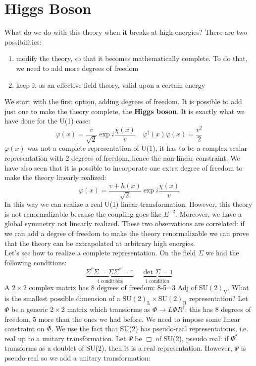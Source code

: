 \documentclass[../main.tex]{subfiles}
\begin{document}
\section{Higgs Boson}
What do we do with this theory when it breaks at high energies? There are two possibilities:
\begin{enumerate}
    \item modify the theory, so that it becomes mathematically complete. To do that, we need to add more degrees of freedom
    \item keep it as an effective field theory, valid upon a certain energy
\end{enumerate}
We start with the first option, adding degrees of freedom. It is possible to add just one to make the theory complete, the \textbf{Higgs boson}. It is exactly what we have done for the U(1) case:
\[
\varphi(x)=\frac{v}{\sqrt{2}}\exp{i\frac{\chi(x)}{v}} \quad \varphi^\dagger(x)\varphi(x)=\frac{v^2}{2}
\]
$\varphi(x)$ was not a complete representation of U(1), it has to be a complex scalar representation with 2 degrees of freedom, hence the non-linear constraint. We have also seen that it is possible to incorporate one extra degree of freedom to make the theory linearly realized:
\[
\varphi(x)=\frac{v+h(x)}{\sqrt{2}}\exp{i\frac{\chi(x)}{v}}
\]
In this way we can realize a real U(1) linear transformation. However, this theory is not renormalizable because the coupling goes like $E^{-2}$. Moreover, we have a global symmetry not linearly realized. These two observations are correlated: if we can add a degree of freedom to make the theory renormalizable we can prove that the theory can be extrapolated at arbitrary high energies. \\
Let's see how to realize a complete representation. On the field $\Sigma$ we had the following conditions:
\[
\underbrace{\Sigma^\dagger\Sigma=\Sigma\Sigma^\dagger=\mathbb{1}}_{\text{4 conditions}} \quad \underbrace{\det\Sigma=1}_{\text{1 condition}}
\]
A $2\times2$ complex matrix has 8 degrees of freedom: 8-5=3 Adj of SU$(2)_{\text{V}}$. What is the smallest possible dimension of a SU$(2)_{\text{L}}\times$SU$(2)_{\text{R}}$ representation? Let $\Phi$ be a generic $2\times2$ matrix which transforms as $\Phi\to L\Phi R^\dagger$: this has 8 degrees of freedom, 5 more than the ones we had before. We need to impose some linear constraint on $\Phi$. We use the fact that SU(2) has pseudo-real representations, i.e. real up to a unitary transformation. Let $\Psi$ be $\Box$ of SU(2), pseudo real: if $\Psi^*$ transforms as a doublet of SU(2), then it is a real representation. However, $\Psi$ is pseudo-real so we add a unitary transformation:
\end{document}
